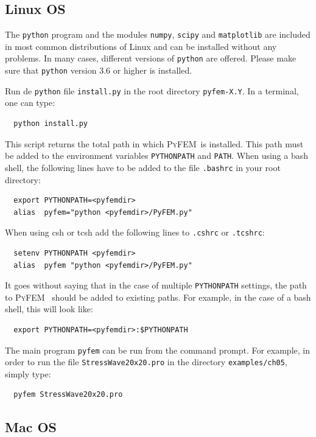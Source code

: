 \documentclass{article}
\newcommand{\progname}{\textsc{PyFEM}}
\begin{document}
\subsection{Linux OS}

The \texttt{python} program and the modules \texttt{numpy}, \texttt{scipy} and \texttt{matplotlib}
are included in most common distributions of Linux and can be installed without any problems. In many
cases, different versions of \texttt{python} are offered. Please make sure that \texttt{python} version 3.6 or higher is
installed.

\noindent Run de \texttt{python} file \texttt{install.py} in the root directory 
\texttt{pyfem-X.Y}. In a terminal, one can type:
\begin{verbatim}
  python install.py
\end{verbatim}
This script returns the total path in which \progname~is installed. This path must be 
added to the environment variables \texttt{PYTHONPATH} and \texttt{PATH}. When using a bash shell, 
the following lines have to be added to the file \texttt{.bashrc} in your root directory:
\begin{verbatim}
  export PYTHONPATH=<pyfemdir>
  alias  pyfem="python <pyfemdir>/PyFEM.py"
\end{verbatim}
When using csh or tcsh add the following lines to \texttt{.cshrc} or \texttt{.tcshrc}:
\begin{verbatim}
  setenv PYTHONPATH <pyfemdir>
  alias  pyfem "python <pyfemdir>/PyFEM.py"
\end{verbatim}
It goes without saying that in the case of multiple \texttt{PYTHONPATH} settings, the path to \progname~ 
should be added to existing paths. For example, in the case of a bash shell, this will look like:
\begin{verbatim}
  export PYTHONPATH=<pyfemdir>:$PYTHONPATH
\end{verbatim}
The main program \texttt{pyfem} can be run from the command prompt. For example, in order to run the
file \texttt{StressWave20x20.pro} in the directory \texttt{examples/ch05}, simply type:
\begin{verbatim}
  pyfem StressWave20x20.pro
\end{verbatim}

\subsection{Mac OS}
\end{document}
